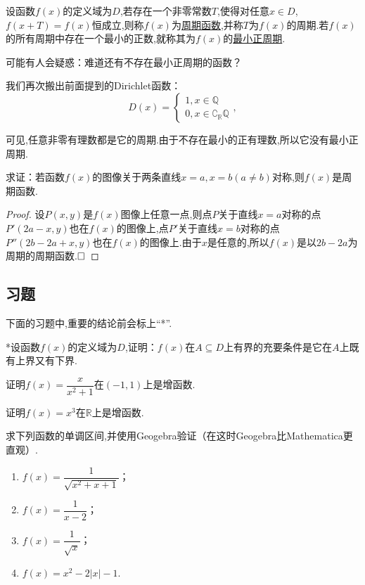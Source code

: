 \documentclass[lang=cn,math=cm,chinesefont=nofont,11pt,scheme=chinese,twocol]{elegantbook}
\begin{document}
\begin{definition}
  设函数$f(x)$的定义域为$D$,若存在一个非零常数$T$,使得对任意$x\in D$,$f(x+T)=f(x)$恒成立,则称$f(x)$为\underline{周期函数},并称$T$为$f(x)$的周期.若$f(x)$的所有周期中存在一个最小的正数,就称其为$f(x)$的\underline{最小正周期}.
\end{definition}

可能有人会疑惑：难道还有不存在最小正周期的函数？

我们再次搬出前面提到的Dirichlet函数： 
$$D(x)=
\begin{cases}
  1,x\in\mathbb{Q}
  \\0,x\in\complement_{\mathbb{R}}\mathbb{Q}
\end{cases},$$

可见,任意非零有理数都是它的周期.由于不存在最小的正有理数,所以它没有最小正周期.

\begin{example}
  求证：若函数$f(x)$的图像关于两条直线$x=a,x=b(a\neq b)$对称,则$f(x)$是周期函数.
\end{example}

\begin{proof}
  设$P(x,y)$是$f(x)$图像上任意一点,则点$P$关于直线$x=a$对称的点$P'(2a-x,y)$也在$f(x)$的图像上,点$P'$关于直线$x=b$对称的点$P''(2b-2a+x,y)$也在$f(x)$的图像上.由于$x$是任意的,所以$f(x)$是以$2b-2a$为周期的周期函数.$\hfill\square$
\end{proof}

\subsection{习题}

下面的习题中,重要的结论前会标上“*”.

\begin{exercise}
  *设函数$f(x)$的定义域为$D$,证明：$f(x)$在$A\subseteq D$上有界的充要条件是它在$A$上既有上界又有下界.
\end{exercise}

\begin{spacing}{1.8}
  \begin{exercise}
    证明$f(x)=\dfrac x{x^2+1}$在$(-1,1)$上是增函数.
  \end{exercise}
  
  \begin{exercise}
    证明$f(x)=x^3$在$\mathbb{R}$上是增函数.
  \end{exercise}
  
  \begin{exercise}
    求下列函数的单调区间,并使用Geogebra验证（在这时Geogebra比Mathematica更直观）.
  \end{exercise}
  
  \begin{enumerate}
    \item $f(x)=\dfrac{1}{\sqrt{x^{2}+x+1}}$；
    \item $f(x)=\dfrac{1}{x-2}$；
    \item $f(x)=\dfrac1{\sqrt{x}}$；
    \item $f(x)=x^{2}-2|x|-1$.
  \end{enumerate}
\end{spacing}
\end{document}
